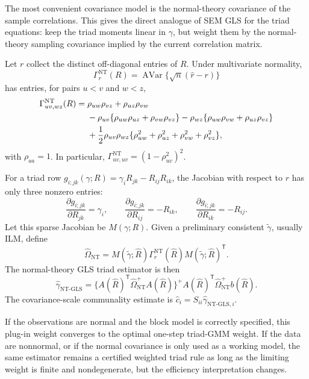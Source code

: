 \documentclass[11pt]{article}
\newcommand{\T}{^{\mathsf T}}
\theoremstyle{plain}
\theoremstyle{remark}
\begin{document}
The most convenient covariance model is the normal-theory covariance of the
sample correlations. This gives the direct analogue of SEM GLS for the triad
equations: keep the triad moments linear in \(\gamma\), but weight them by the
normal-theory sampling covariance implied by the current correlation matrix.

Let \(r\) collect the distinct off-diagonal entries of \(R\). Under
multivariate normality,
\[
  \Gamma_r^{\mathrm{NT}}(R)
  =
  \operatorname{AVar}\{\sqrt n(\hat r-r)\}
\]
has entries, for pairs \(u<v\) and \(w<z\),
\begin{align}\label{eq:nt-correlation-gamma}
  \Gamma^{\mathrm{NT}}_{uv,wz}(R)
  ={}&
  \rho_{uw}\rho_{vz}+\rho_{uz}\rho_{vw} \notag\\
  &-\rho_{uv}\{\rho_{uw}\rho_{uz}+\rho_{vw}\rho_{vz}\}
   -\rho_{wz}\{\rho_{uw}\rho_{vw}+\rho_{uz}\rho_{vz}\} \notag\\
  &+\frac{1}{2}\rho_{uv}\rho_{wz}
    \{\rho_{uw}^2+\rho_{uz}^2+\rho_{vw}^2+\rho_{vz}^2\},
\end{align}
with \(\rho_{aa}=1\). In particular,
\(\Gamma^{\mathrm{NT}}_{uv,uv}=(1-\rho_{uv}^2)^2\).

For a triad row \(g_{i;jk}(\gamma;R)=\gamma_iR_{jk}-R_{ij}R_{ik}\), the
Jacobian with respect to \(r\) has only three nonzero entries:
\[
  \frac{\partial g_{i;jk}}{\partial R_{jk}}=\gamma_i,
  \qquad
  \frac{\partial g_{i;jk}}{\partial R_{ij}}=-R_{ik},
  \qquad
  \frac{\partial g_{i;jk}}{\partial R_{ik}}=-R_{ij}.
\]
Let this sparse Jacobian be \(M(\gamma;R)\). Given a preliminary consistent
\(\tilde\gamma\), usually ILM, define
\[
  \widehat\Omega_{\mathrm{NT}}
  =
  M(\tilde\gamma;\hat R)
  \Gamma_r^{\mathrm{NT}}(\hat R)
  M(\tilde\gamma;\hat R)\T .
\]
The normal-theory GLS triad estimator is then
\begin{equation}\label{eq:nt-gls-triad}
  \hat\gamma_{\mathrm{NT\text{-}GLS}}
  =
  \{A(\hat R)\T\widehat\Omega_{\mathrm{NT}}^{+}A(\hat R)\}^{+}
  A(\hat R)\T\widehat\Omega_{\mathrm{NT}}^{+}b(\hat R).
\end{equation}
The covariance-scale communality estimate is
\(\hat c_i=S_{ii}\hat\gamma_{\mathrm{NT\text{-}GLS},i}\).

If the observations are normal and the block model is correctly specified, this
plug-in weight converges to the optimal one-step triad-GMM weight. If the data
are nonnormal, or if the normal covariance is only used as a working model, the
same estimator remains a certified weighted triad rule as long as the limiting
weight is finite and nondegenerate, but the efficiency interpretation changes.
\end{document}
